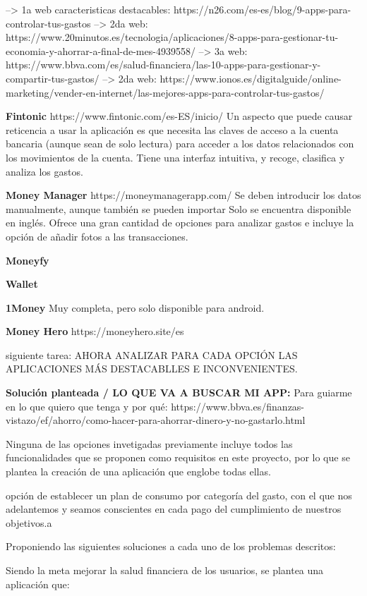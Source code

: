 --> 1a web caracteristicas destacables: https://n26.com/es-es/blog/9-apps-para-controlar-tus-gastos 
--> 2da web: https://www.20minutos.es/tecnologia/aplicaciones/8-apps-para-gestionar-tu-economia-y-ahorrar-a-final-de-mes-4939558/ 
--> 3a web: https://www.bbva.com/es/salud-financiera/las-10-apps-para-gestionar-y-compartir-tus-gastos/ 
--> 2da web: https://www.ionos.es/digitalguide/online-marketing/vender-en-internet/las-mejores-apps-para-controlar-tus-gastos/ 

\textbf{Fintonic} https://www.fintonic.com/es-ES/inicio/ 
Un aspecto que puede causar reticencia a usar la aplicación es que necesita 
las claves de acceso a la cuenta bancaria (aunque sean de solo lectura) 
para acceder a los datos relacionados con los movimientos de la cuenta.
Tiene una interfaz intuitiva, y recoge, clasifica y analiza los gastos.


\textbf{Money Manager}  https://moneymanagerapp.com/
Se deben introducir los datos manualmente, aunque también se pueden importar
Solo se encuentra disponible en inglés. Ofrece una gran cantidad de opciones
para analizar gastos e incluye la opción de añadir fotos a las transacciones.

\textbf{Moneyfy} 

\textbf{Wallet} 

\textbf{1Money} 
Muy completa, pero solo disponible para android.


\textbf{Money Hero} https://moneyhero.site/es  


siguiente tarea:
AHORA ANALIZAR PARA CADA OPCIÓN LAS APLICACIONES MÁS DESTACABLLES E INCONVENIENTES.


\textbf{Solución planteada / LO QUE VA A BUSCAR MI APP:}
Para guiarme en lo que quiero que tenga y por qué:
https://www.bbva.es/finanzas-vistazo/ef/ahorro/como-hacer-para-ahorrar-dinero-y-no-gastarlo.html

Ninguna de las opciones invetigadas previamente incluye todos las funcionalidades 
que se proponen como requisitos en este proyecto, por lo que se plantea la creación
de una aplicación que englobe todas ellas.

opción de establecer un plan de consumo por categoría del gasto, con el que nos adelantemos y 
seamos conscientes en cada pago del cumplimiento de nuestros objetivos.a

Proponiendo las siguientes soluciones a cada uno de los problemas descritos:

Siendo la meta mejorar la salud financiera de los usuarios, se plantea una aplicación que:

